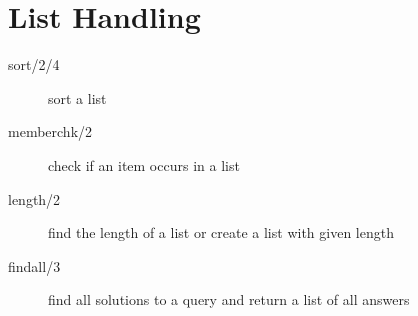 \documentclass[a4paper,12pt]{report}
\begin{document}
\section{List Handling}
\begin{description}
\item[sort/2/4] sort a list
\item[memberchk/2] check if an item occurs in a list
\item[length/2] find the length of a list or create a list with given length
\item[findall/3] find all solutions to a query and return a list of all answers
\end{description}
\printindex
\end{document}
